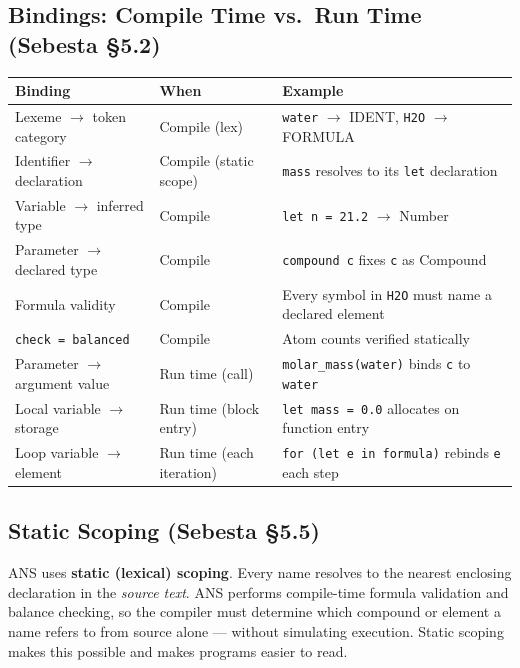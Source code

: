 \documentclass[11pt,a4paper]{article}
\newcommand{\code}[1]{\texttt{#1}}
\begin{document}
\subsection{Bindings: Compile Time vs.\ Run Time (Sebesta \S5.2)}
\begin{tabularx}{\textwidth}{@{} L{4.0cm} L{2.8cm} Y @{}}
\toprule
\textbf{Binding} & \textbf{When} & \textbf{Example} \\
\midrule
Lexeme $\to$ token category & Compile (lex) & \code{water} $\to$ IDENT, \code{H2O} $\to$ FORMULA \\
Identifier $\to$ declaration & Compile (static scope) & \code{mass} resolves to its \code{let} declaration \\
Variable $\to$ inferred type & Compile & \code{let n = 21.2} $\to$ Number \\
Parameter $\to$ declared type & Compile & \code{compound c} fixes \code{c} as Compound \\
Formula validity & Compile & Every symbol in \code{H2O} must name a declared element \\
\code{check = balanced} & Compile & Atom counts verified statically \\
Parameter $\to$ argument value & Run time (call) & \code{molar\_mass(water)} binds \code{c} to \code{water} \\
Local variable $\to$ storage & Run time (block entry) & \code{let mass = 0.0} allocates on function entry \\
Loop variable $\to$ element & Run time (each iteration) & \code{for (let e in formula)} rebinds \code{e} each step \\
\bottomrule
\end{tabularx}

\subsection{Static Scoping (Sebesta \S5.5)}
ANS uses \textbf{static (lexical) scoping}. Every name resolves to the nearest enclosing declaration in the \emph{source text}. ANS performs compile-time formula validation and balance checking, so the compiler must determine which compound or element a name refers to from source alone --- without simulating execution. Static scoping makes this possible and makes programs easier to read.
\end{document}

